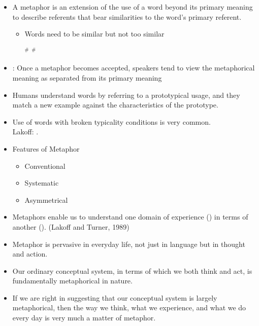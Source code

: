 \documentclass[headrule,footrule]{foils}
\begin{document}
\begin{itemize}
\item A metaphor is an extension of the use of a word beyond its
primary meaning to describe referents that bear similarities to
the word’s primary referent.
\begin{itemize}
\item Words need to be similar but not too similar
  \begin{exe}
    \ex $^\#$
    \ex $^\#$
    \ex {}
  \end{exe}
\end{itemize}
\item {}: Once a metaphor becomes accepted,
  speakers tend to view the metaphorical meaning as separated from its
  primary meaning
  \begin{exe}
    \ex {}
    \end{exe}
\newpage
\item Humans understand words by referring to a prototypical usage,
and they match a new example against the characteristics of the
prototype.
\item  Use of words with broken typicality conditions is very common.
\\ Lakoff: .
\item Features of Metaphor
  \begin{itemize}
  \item Conventional
  \item Systematic
  \item Asymmetrical
  \end{itemize}
\item  Metaphors enable us to understand one
  domain of experience () in terms of another ().
\hfill (Lakoff and Turner, 1989)
\end{itemize}



\begin{itemize}
\item Metaphor is pervasive in everyday life, not just in
language but in thought and action.
\item Our ordinary conceptual system, in terms of which we
both think and act, is fundamentally metaphorical in
nature.
\item If we are right in suggesting that our conceptual system
is largely metaphorical, then the way we think, what we
experience, and what we do every day is very much a
matter of metaphor.
\end{itemize}
\end{document}
